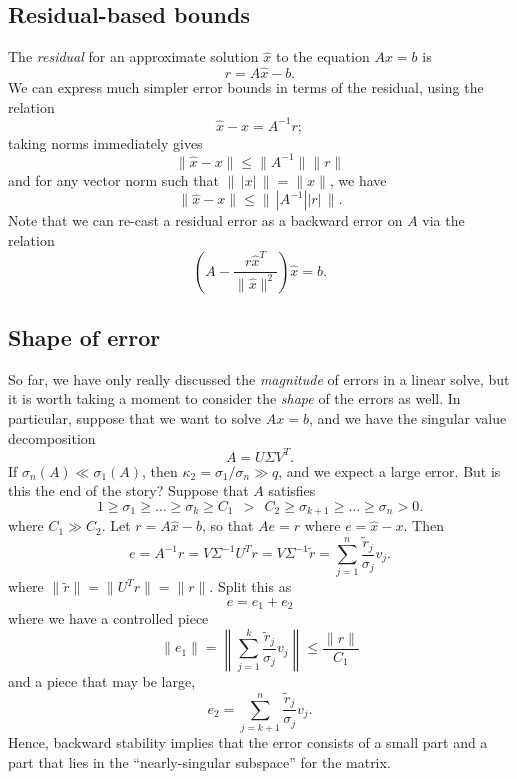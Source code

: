 \documentclass[12pt, leqno]{article} %
\begin{document}
\subsection{Residual-based bounds}

The {\em residual} for an approximate solution $\hat{x}$ to the
equation $Ax = b$ is
\[
  r = A \hat{x} - b.
\]
We can express much simpler error bounds in terms of the residual,
using the relation
\[
  \hat{x}-x = A^{-1} r;
\]
taking norms immediately gives
\[
  \|\hat{x}-x\| \leq \|A^{-1}\| \|r\|
\]
and for any vector norm such that $\|\,|x|\,\|=\|x\|$, we have
\[
  \|\hat{x}-x\| \leq \| \, |A^{-1}| |r| \, \|.
\]
Note that we can re-cast a residual error as a backward error on $A$
via the relation
\[
  \left( A - \frac{r\hat{x}^T}{\|\hat{x}\|^2} \right) \hat{x} = b.
\]

\subsection{Shape of error}

So far, we have only really discussed the {\em magnitude} of
errors in a linear solve, but it is worth taking a moment to
consider the {\em shape} of the errors as well.  In particular,
suppose that we want to solve $Ax = b$, and we have the
singular value decomposition
\[
  A = U \Sigma V^T.
\]
If $\sigma_n(A) \ll \sigma_1(A)$, then $\kappa_2 = \sigma_1/\sigma_n \gg q$,
and we expect a large error.  But is this the end of the story?
Suppose that $A$ satisfies
\[
  1 \geq \sigma_1 \geq \ldots \geq \sigma_k \geq C_1 ~~ > ~~
  C_2 \geq \sigma_{k+1} \geq \ldots \geq \sigma_n > 0.
\]
where $C_1 \gg C_2$.  Let $r = A \hat{x} - b$, so that $Ae = r$
where $e = \hat{x}-x$.  Then
\[
  e = A^{-1} r = V \Sigma^{-1} U^T r = V \Sigma^{-1} \tilde{r}
    = \sum_{j=1}^n \frac{\tilde{r}_j}{\sigma_j} v_j.
\]
where $\|\tilde{r}\| = \|U^T r\| = \|r\|$.  Split this as
\[
  e = e_1 + e_2
\]
where we have a controlled piece
\[
  \|e_1\| = \left\| \sum_{j=1}^k \frac{\tilde{r}_j}{\sigma_j} v_j \right\|
          \leq \frac{\|r\|}{C_1}
\]
and a piece that may be large,
\[
  e_2 = \sum_{j={k+1}}^n \frac{\tilde{r}_j}{\sigma_j} v_j.
\]
Hence, backward stability implies that the error consists of a small
part and a part that lies in the ``nearly-singular subspace'' for the
matrix.
\end{document}
